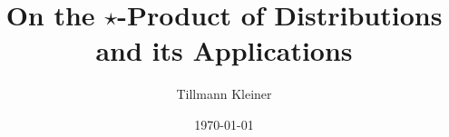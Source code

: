 \title{On the $\star$-Product of Distributions and its Applications}
\author{Tillmann Kleiner}
\date{\today}

\maketitle

